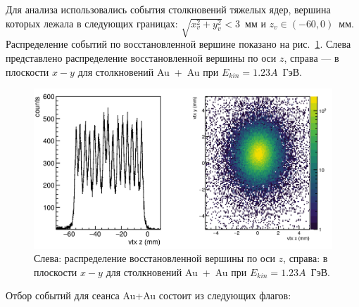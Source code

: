 Для анализа использовались события столкновений тяжелых ядер, вершина которых лежала в следующих границах: $\sqrt{x_v^2+y_v^2}<3$~мм и $z_v \in (-60, 0)$~мм.
Распределение событий по восстановленной вершине показано на рис.~\ref{fig:hades_vertex}.
Слева представлено распределение восстановленной вершины по оси $z$, справа --- в плоскости $x-y$ для столкновений Au~+~Au при $E_{kin}=1.23A$~ГэВ.
\begin{figure}[ht]
    \begin{center}
        \includegraphics[width=0.95\linewidth]{images/hades_vertex.png}
        \caption{Слева: распределение восстановленной вершины по оси $z$, справа: в плоскости $x-y$ для столкновений Au~+~Au при $E_{kin}=1.23A$~ГэВ.}
        \label{fig:hades_vertex}
    \end{center}
\end{figure}

Отбор событий для сеанса Au+Au состоит из следующих флагов:

